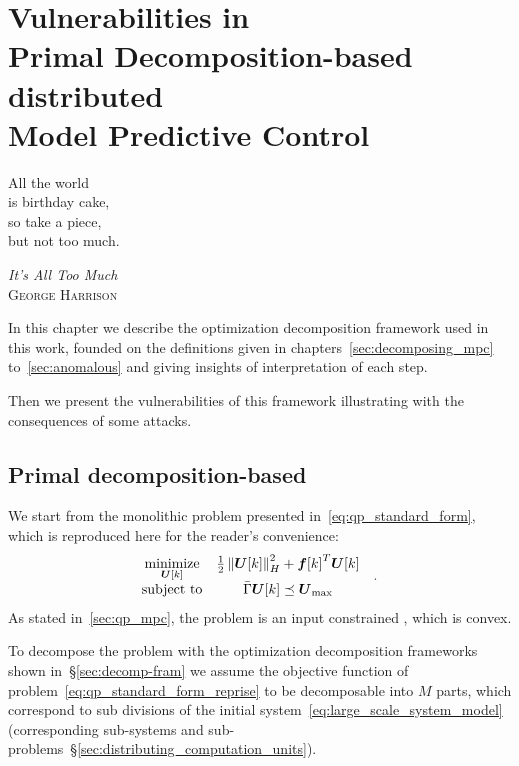 \documentclass[../main.tex]{subfiles}
\begin{document}
\chapter[Vulnerabilities in Primal Decomposition-based dMPC]{Vulnerabilities in \\Primal Decomposition-based \\distributed \\Model Predictive Control}\label{sec:primal_decomposition}
\epigraph{\centering All the world\\ is birthday cake,\\ so take a piece, \\but not too much.}
{\textit{It's All Too Much}\\\textsc{George Harrison}}

In this chapter we describe the optimization decomposition framework used in this work, founded on the definitions given in chapters~\ref{sec:decomposing_mpc} to~\ref{sec:anomalous} and giving insights of interpretation of each step.

Then we present the vulnerabilities of this framework illustrating with the consequences of some attacks.

\minitoc

\section{Primal decomposition-based \dmpc{}}\label{sec:decomposition_PD}

We start from the monolithic \mpc{} problem presented in~\eqref{eq:qp_standard_form}, which is reproduced here for the reader's convenience:
\begin{equation}
  \label{eq:qp_standard_form_reprise}
  \begin{aligned}
    \begin{matrix}
      \underset{\boldsymbol{U}[k]}{\mathrm{minimize}} &
      \frac{1}{2}\left\lVert\boldsymbol{U}[k]\right\rVert^{2}_{H} + {\boldsymbol{f}[k]}^{T}\boldsymbol{U}[k] &\\
      \mathrm{subject~ to} &
\bar{\Gamma}\boldsymbol{U}[k]\preceq {\boldsymbol{U}}_{\text{max}}
    \end{matrix}
  \end{aligned}.
\end{equation}
As stated in~\ref{sec:qp_mpc}, the problem is an input constrained \qp{}, which is convex.

To decompose the problem with the optimization decomposition frameworks shown in~\S\ref{sec:decomp-fram} we assume the objective function of problem~\eqref{eq:qp_standard_form_reprise} to be decomposable into $M$ parts, which correspond to sub divisions of the initial system~\eqref{eq:large_scale_system_model} (corresponding sub-systems and sub-problems~\S\ref{sec:distributing_computation_units}).
\end{document}
